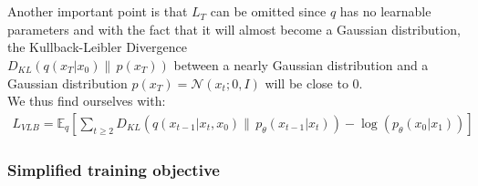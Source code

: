 \documentclass[twoside]{article}
\numberwithin{equation}{section}
\numberwithin{figure}{section}
\begin{document}
\\\\
Another important point is that $L_T$ can be omitted since $q$ has no learnable parameters and with the fact that it will almost become a Gaussian distribution, the Kullback-Leibler Divergence \\
$D_{KL}\left(q\left(x_T | x_0\right) \| \, p\left(x_T\right)\right)$ between a nearly Gaussian distribution and a Gaussian distribution $p\left(x_T\right) = \mathcal{N}\left(x_t; 0, I\right)$ will be close to 0. \cite{ho2020denoising} \\
We thus find ourselves with:
\begin{gather}
  L_{VLB} = \mathbb{E}_q \left[ \sum_{t \geq 2} D_{KL}\left(q\left(x_{t-1} | x_t, x_0\right) \| \, p_{\theta}\left(x_{t-1} | x_t\right)\right) - \log\left(p_{\theta}\left(x_0 | x_1\right)\right) \right]
\end{gather}

\subsubsection{Simplified training objective}
\end{document}
